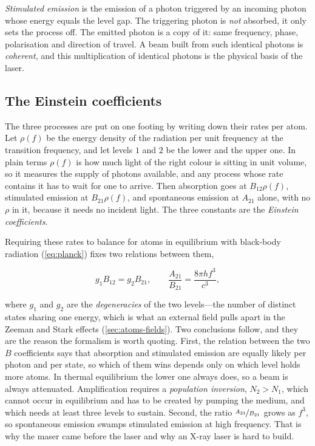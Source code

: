         \emph{Stimulated emission} is the emission of a photon triggered by an incoming photon whose energy equals the level gap. The triggering photon is \emph{not} absorbed, it only sets the process off. The emitted photon is a copy of it: same frequency, phase, polarisation and direction of travel. A beam built from such identical photons is \emph{coherent}, and this multiplication of identical photons is the physical basis of the laser.

    \subsection{The Einstein coefficients}

        The three processes are put on one footing by writing down their rates per atom. Let $\rho(f)$ be the energy density of the radiation per unit frequency at the transition frequency, and let levels $1$ and $2$ be the lower and the upper one. In plain terms $\rho(f)$ is how much light of the right colour is sitting in unit volume, so it measures the supply of photons available, and any process whose rate contains it has to wait for one to arrive. Then absorption goes at $B_{12}\rho(f)$, stimulated emission at $B_{21}\rho(f)$, and spontaneous emission at $A_{21}$ alone, with no $\rho$ in it, because it needs no incident light. The three constants are the \emph{Einstein coefficients}.

        Requiring these rates to balance for atoms in equilibrium with black-body radiation (\cref{eq:planck}) fixes two relations between them,

        \begin{equation*}
            g_{1}B_{12} = g_{2}B_{21}, \qquad \frac{A_{21}}{B_{21}} = \frac{8\pi hf^{3}}{c^{3}},
        \end{equation*}

        where $g_{1}$ and $g_{2}$ are the \emph{degeneracies} of the two levels---the number of distinct states sharing one energy, which is what an external field pulls apart in the Zeeman and Stark effects (\cref{sec:atoms-fields}). Two conclusions follow, and they are the reason the formalism is worth quoting. First, the relation between the two $B$ coefficients says that absorption and stimulated emission are equally likely per photon and per state, so which of them wins depends only on which level holds more atoms. In thermal equilibrium the lower one always does, so a beam is always attenuated. Amplification requires a \emph{population inversion}, $N_{2} > N_{1}$, which cannot occur in equilibrium and has to be created by pumping the medium, and which needs at least three levels to sustain. Second, the ratio $\nicefrac{A_{21}}{B_{21}}$ grows as $f^{3}$, so spontaneous emission swamps stimulated emission at high frequency. That is why the maser came before the laser and why an X-ray laser is hard to build.

